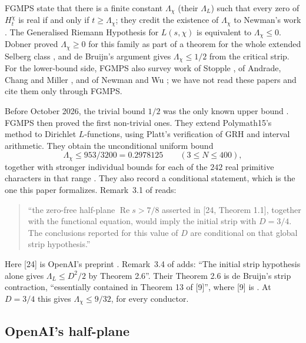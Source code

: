 \documentclass[11pt]{article}
\theoremstyle{definition}
\newcommand{\re}{\operatorname{Re}}
\newcommand{\Lc}{\Lambda}
\begin{document}
FGMPS state that there is a finite constant $\Lc_\chi$ (their $\Lc_L$) such that every zero of $H^\chi_t$ is real if and only if $t \ge \Lc_\chi$; they credit the existence of $\Lc_\chi$ to Newman's work \cite{Newman1976}. The Generalised Riemann Hypothesis for $L(s,\chi)$ is equivalent to $\Lc_\chi \le 0$. Dobner proved $\Lc_\chi \ge 0$ for this family as part of a theorem for the whole extended Selberg class \cite{Dobner2021}, and de Bruijn's argument gives $\Lc_\chi \le 1/2$ from the critical strip. For the lower-bound side, FGMPS also survey work of Stopple \cite{Stopple2014}, of Andrade, Chang and Miller \cite{AndradeChangMiller2014}, and of Newman and Wu \cite{NewmanWu2020}; we have not read these papers and cite them only through FGMPS.

Before October 2026, the trivial bound $1/2$ was the only known upper bound \cite[\S1.4]{FGMPS2026}. FGMPS then proved the first non-trivial ones. They extend Polymath15's method to Dirichlet $L$-functions, using Platt's verification of GRH \cite{Platt2016} and interval arithmetic. They obtain the unconditional uniform bound
\[
\Lc_\chi \le 953/3200 = 0.2978125 \qquad (3 \le N \le 400),
\]
together with stronger individual bounds for each of the $242$ real primitive characters in that range \cite[Theorem 1.1, \S7.7]{FGMPS2026}. They also record a conditional statement, which is the one this paper formalizes. Remark~3.1 of \cite{FGMPS2026} reads:
\begin{quote}\small
``the zero-free half-plane $\re s > 7/8$ asserted in [24, Theorem 1.1], together with the functional equation, would imply the initial strip with $D = 3/4$. The conclusions reported for this value of $D$ are conditional on that global strip hypothesis.''
\end{quote}
Here [24] is OpenAI's preprint \cite{OAI7over8}. Remark~3.4 of \cite{FGMPS2026} adds: ``The initial strip hypothesis alone gives $\Lc_L \le D^2/2$ by Theorem 2.6''. Their Theorem 2.6 is de Bruijn's strip contraction, ``essentially contained in Theorem 13 of [9]'', where [9] is \cite{deBruijn1950}. At $D = 3/4$ this gives $\Lc_\chi \le 9/32$, for every conductor.

\subsection{OpenAI's half-plane}
\end{document}
